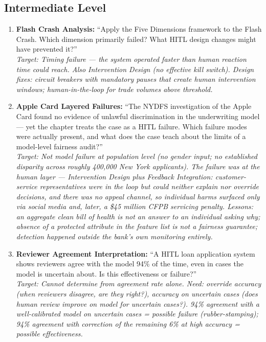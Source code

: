 \subsection{Intermediate Level}

\begin{enumerate}
    \item \textbf{Flash Crash Analysis:} ``Apply the Five Dimensions framework to the Flash Crash. Which dimension primarily failed? What HITL design changes might have prevented it?''\\
    \textit{Target: Timing failure --- the system operated faster than human reaction time could reach. Also Intervention Design (no effective kill switch). Design fixes: circuit breakers with mandatory pauses that create human intervention windows; human-in-the-loop for trade volumes above threshold.}

    \item \textbf{Apple Card Layered Failures:} ``The NYDFS investigation of the Apple Card found no evidence of unlawful discrimination in the underwriting model --- yet the chapter treats the case as a HITL failure. Which failure modes were actually present, and what does the case teach about the limits of a model-level fairness audit?''\\
    \textit{Target: Not model failure at population level (no gender input; no established disparity across roughly 400,000 New York applicants). The failure was at the human layer --- Intervention Design plus Feedback Integration: customer-service representatives were in the loop but could neither explain nor override decisions, and there was no appeal channel, so individual harms surfaced only via social media and, later, a \$45 million CFPB servicing penalty. Lessons: an aggregate clean bill of health is not an answer to an individual asking \emph{why}; absence of a protected attribute in the feature list is not a fairness guarantee; detection happened outside the bank's own monitoring entirely.}

    \item \textbf{Reviewer Agreement Interpretation:} ``A HITL loan application system shows reviewers agree with the model 94\% of the time, even in cases the model is uncertain about. Is this effectiveness or failure?''\\
    \textit{Target: Cannot determine from agreement rate alone. Need: override accuracy (when reviewers disagree, are they right?), accuracy on uncertain cases (does human review improve on model for uncertain cases?). 94\% agreement with a well-calibrated model on uncertain cases = possible failure (rubber-stamping); 94\% agreement with correction of the remaining 6\% at high accuracy = possible effectiveness.}


\end{enumerate}

